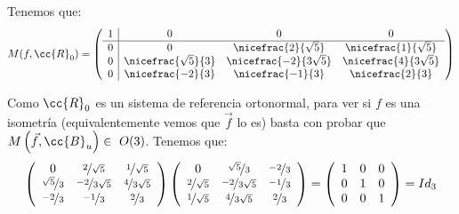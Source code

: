 \begin{ejercicio}
\begin{enumerate}
        Tenemos que:
        \begin{equation*}
            M(f,\cc{R}_0) = \left(\begin{array}{c|ccc}
                1 & 0 & 0 & 0 \\ \hline
                0 & 0 & \nicefrac{2}{\sqrt{5}} & \nicefrac{1}{\sqrt{5}} \\
                0 & \nicefrac{\sqrt{5}}{3} & \nicefrac{-2}{3\sqrt{5}} & \nicefrac{4}{3\sqrt{5}} \\
                0 & \nicefrac{-2}{3} & \nicefrac{-1}{3} & \nicefrac{2}{3} 
            \end{array}\right)
        \end{equation*}

        Como $\cc{R}_0$ es un sistema de referencia ortonormal, para ver si $f$ es una isometría (equivalentemente vemos que $\vec{f}$ lo es) basta con probar que $M\left(\vec{f}, \cc{B}_u\right)\in~O(3)$. Tenemos que:
        \begin{equation*}
            \left(
            \begin{array}{ccc}
                0 & \nicefrac{2}{\sqrt{5}} & \nicefrac{1}{\sqrt{5}} \\
                \nicefrac{\sqrt{5}}{3} & \nicefrac{-2}{3\sqrt{5}} & \nicefrac{4}{3\sqrt{5}} \\
                \nicefrac{-2}{3} & \nicefrac{-1}{3} & \nicefrac{2}{3}
            \end{array}
            \right)
            \left(
            \begin{array}{ccc}
                0 & \nicefrac{\sqrt{5}}{3} &  \nicefrac{-2}{3}\\
                \nicefrac{2}{\sqrt{5}} & \nicefrac{-2}{3\sqrt{5}} & \nicefrac{-1}{3} \\
                \nicefrac{1}{\sqrt{5}} & \nicefrac{4}{3\sqrt{5}} & \nicefrac{2}{3}
            \end{array}
            \right)
            = 
            \left(
            \begin{array}{ccc}
                1 & 0 & 0\\
                0 & 1 & 0\\
                0 & 0 & 1
            \end{array}
            \right) = Id_3
        \end{equation*}


\end{enumerate}
\end{ejercicio}
